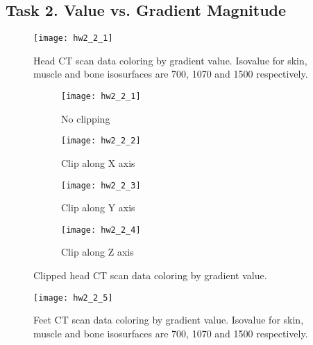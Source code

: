 \documentclass[11pt]{article}
\begin{document}
\subsection*{Task 2. Value vs. Gradient Magnitude}

\begin{figure}[H]
\centering
\texttt{[image: hw2\_2\_1]}
\caption{Head CT scan data coloring by gradient value. Isovalue for skin, muscle and bone isosurfaces are 700, 1070 and 1500 respectively.}
\label{fig:hw2_2_1}
\end{figure}

\begin{figure}[H]
\begin{subfigure}{.5\textwidth}
  \centering
  \texttt{[image: hw2\_2\_1]}
  \caption{No clipping}
  \label{fig:hw2_2_1}
\end{subfigure}
\begin{subfigure}{.5\textwidth}
  \centering
  \texttt{[image: hw2\_2\_2]}
  \caption{Clip along X axis}
  \label{fig:hw2_2_2}
\end{subfigure}

\begin{subfigure}{.5\textwidth}
  \centering
  \texttt{[image: hw2\_2\_3]}
  \caption{Clip along Y axis}
  \label{fig:hw2_2_3}
\end{subfigure}
\begin{subfigure}{.5\textwidth}
  \centering
  \texttt{[image: hw2\_2\_4]}
  \caption{Clip along Z axis}
  \label{fig:hw2_2_4}
\end{subfigure}
\caption{Clipped head CT scan data coloring by gradient value.}
\label{fig:hw2_2_1-4}
\end{figure}

\begin{figure}[H]
\centering
\texttt{[image: hw2\_2\_5]}
\caption{Feet CT scan data coloring by gradient value. Isovalue for skin, muscle and bone isosurfaces are 700, 1070 and 1500 respectively.}
\label{fig:hw2_2_5}
\end{figure}
\end{document}
